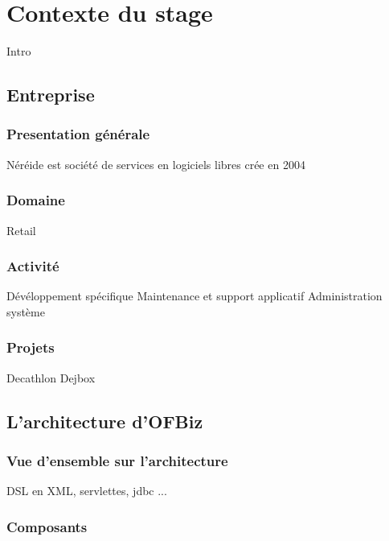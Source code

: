 \chapter{Contexte du stage}

Intro

\section{Entreprise}

\subsection{Presentation générale }
Néréide est société de services en logiciels libres crée en 2004  


























\subsection{Domaine}
Retail
\subsection{Activité}
Dévéloppement spécifique 
Maintenance et support applicatif
Administration système
\subsection{Projets}
Decathlon
Dejbox








\section{L'architecture d'OFBiz}
\subsection{Vue d'ensemble sur l'architecture}
DSL en XML, servlettes, jdbc ...
\subsection{Composants }

